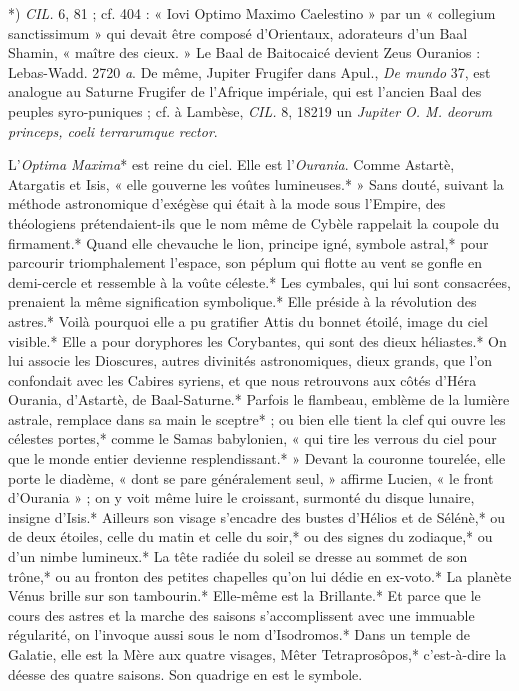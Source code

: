 \documentclass[a4paper, 11pt, oneside, polutonikogreek, french]{article}
\begin{document}
*) \emph{CIL.} 6, 81 ; cf. 404 : « Iovi Optimo Maximo Caelestino » par un « collegium sanctissimum » qui devait être composé d'Orientaux, adorateurs d'un Baal Shamin, « maître des cieux. » Le Baal de Baitocaicé devient Zeus Ouranios : Lebas-Wadd. 2720 \emph{a}. De même, Jupiter Frugifer dans Apul., \emph{De mundo} 37, est analogue au Saturne Frugifer de l'Afrique impériale, qui est l'ancien Baal des peuples syro-puniques ; cf. à Lambèse, \emph{CIL.} 8, 18219 un \emph{Jupiter O. M. deorum princeps, coeli terrarumque rector}.

L'\emph{Optima Maxima}* est reine du ciel. Elle est l'\emph{Ourania}. Comme Astartè, Atargatis et Isis, « elle gouverne les voûtes lumineuses.* » Sans douté, suivant la méthode astronomique d'exégèse qui était à la mode sous l'Empire, des théologiens prétendaient-ils que le nom même de Cybèle rappelait la coupole du firmament.* Quand elle chevauche le lion, principe igné, symbole astral,* pour parcourir triomphalement l'espace, son péplum qui flotte au vent se gonfle en demi-cercle et ressemble à la voûte céleste.* Les cymbales, qui lui sont consacrées, prenaient la même signification symbolique.* Elle préside à la révolution des astres.* Voilà pourquoi elle a pu gratifier Attis du bonnet étoilé, image du ciel visible.* Elle a pour doryphores les Corybantes, qui sont des dieux héliastes.* On lui associe les Dioscures, autres divinités astronomiques, dieux grands, que l'on confondait avec les Cabires syriens, et que nous retrouvons aux côtés d'Héra Ourania, d'Astartè, de Baal-Saturne.* Parfois le flambeau, emblème de la lumière astrale, remplace dans sa main le sceptre* ; ou bien elle tient la clef qui ouvre les célestes portes,* comme le Samas babylonien, « qui tire les verrous du ciel pour que le monde entier devienne resplendissant.* » Devant la couronne tourelée, elle porte le diadème, « dont se pare généralement seul, » affirme Lucien, « le front d'Ourania » ; on y voit même luire le croissant, surmonté du disque lunaire, insigne d'Isis.* Ailleurs son visage s'encadre des bustes d'Hélios et de Sélénè,* ou de deux étoiles, celle du matin et celle du soir,* ou des signes du zodiaque,* ou d'un nimbe lumineux.* La tête radiée du soleil se dresse au sommet de son trône,* ou au fronton des petites chapelles qu'on lui dédie en ex-voto.* La planète Vénus brille sur son tambourin.* Elle-même est la Brillante.* Et parce que le cours des astres et la marche des saisons s'accomplissent avec une immuable régularité, on l'invoque aussi sous le nom d'Isodromos.* Dans un temple de Galatie, elle est la Mère aux quatre visages, Mêter Tetraprosôpos,* c'est-à-dire la déesse des quatre saisons. Son quadrige en est le symbole.
\end{document}
